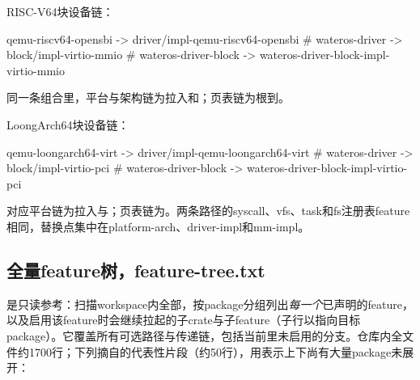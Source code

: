 RISC-V64块设备链：

\begin{textcode}
qemu-riscv64-opensbi
  -> driver/impl-qemu-riscv64-opensbi          # wateros-driver
       -> block/impl-virtio-mmio                 # wateros-driver-block
            -> wateros-driver-block-impl-virtio-mmio
\end{textcode}

同一条组合里，平台与架构链为拉入和；页表链为根到。

LoongArch64块设备链：

\begin{textcode}
qemu-loongarch64-virt
  -> driver/impl-qemu-loongarch64-virt          # wateros-driver
       -> block/impl-virtio-pci                  # wateros-driver-block
            -> wateros-driver-block-impl-virtio-pci
\end{textcode}

对应平台链为拉入与；页表链为。两条路径的syscall、vfs、task和fs注册表feature相同，替换点集中在platform-arch、driver-impl和mm-impl。


\subsection{全量feature树，feature-tree.txt}\label{sec:feature-tree-full}

是只读参考：扫描workspace内全部，按package分组列出\emph{每一个}已声明的feature，以及启用该feature时会继续拉起的子crate与子feature（子行以\code{>}指向目标package）。它覆盖所有可选路径与传递链，包括当前里未启用的分支。仓库内全文件约1700行；下列摘自的代表性片段（约50行），用表示上下尚有大量package未展开：

